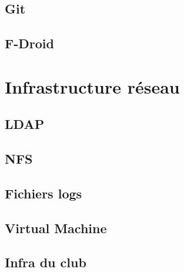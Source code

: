 \documentclass[a4paper]{report}
\begin{document}
  \section{Git}
    
  \section{F-Droid}
    
    
\chapter{Infrastructure réseau}
  \section{LDAP}
    
  \section{NFS}
    
  \section{Fichiers logs}
    
  \section{Virtual Machine}
    
  \section{Infra du club}
    
\end{document}
